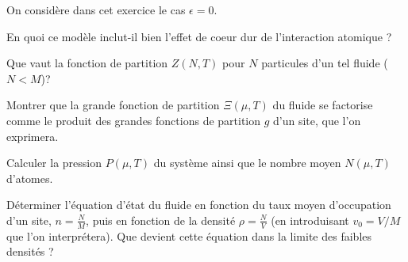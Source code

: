 On considère dans cet exercice le cas $\epsilon=0$.

\medskip

\question
En quoi ce modèle inclut-il bien l'effet de coeur dur de l'interaction atomique ?
 
\question
Que vaut la fonction de partition $Z(N,T)$ pour $N$ particules d'un tel fluide  ($N<M$)?

\question
Montrer que la grande fonction de partition $\Xi(\mu,T)$ du fluide se factorise comme le produit des grandes fonctions de partition $g$ d'un site, que l'on exprimera.

\question
Calculer la pression $P(\mu,T)$ du système ainsi que le nombre moyen $N(\mu,T)$ d'atomes. 

\question
Déterminer l'équation d'état du fluide en fonction du taux moyen d'occupation d'un site, $n=\frac{N}{M}$, puis en fonction de la densité $\rho=\frac{N}{V}$ (en introduisant $v_0=V/M$ que l'on interprétera).  Que devient cette équation dans la limite des faibles densités ?
